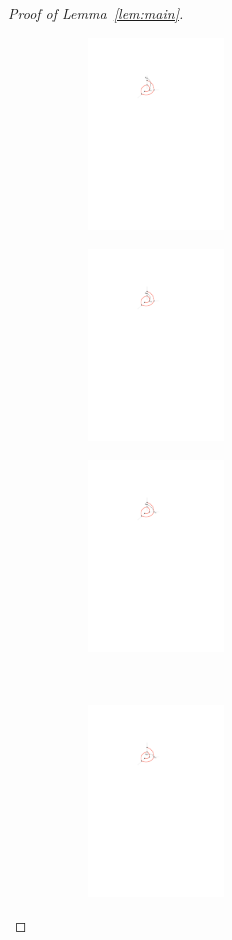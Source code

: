 \documentclass{jgaa-art}
\newcommand{\lemref}[1]{Lemma~\ref{lem:#1}}
\begin{document}
\begin{proof}[Proof of \lemref{main}]
 \renewcommand{\thesubfigure}{\arabic{subfigure}}
  \begin{figure}
    \begin{center}
    \begin{subfigure}[t]{0.3\hsize}\includegraphics[width=36mm]{figs/2layermaximum-1} \caption{}\end{subfigure}
    \begin{subfigure}[t]{0.3\hsize}\includegraphics[width=36mm]{figs/2layermaximum-2} \caption{}\end{subfigure}
    \begin{subfigure}[t]{0.3\hsize}\includegraphics[width=36mm]{figs/2layermaximum-3} \caption{}\end{subfigure}
    \\[2ex]
    \begin{subfigure}[t]{0.4\hsize}\includegraphics[width=36mm]{figs/2layermaximum-4} \caption{}\end{subfigure}

\end{center}
\end{figure}
\end{proof}
\end{document}
